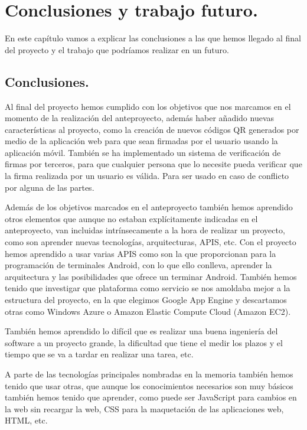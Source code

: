 \chapter{Conclusiones y trabajo futuro.}

En este capítulo vamos a explicar las conclusiones a las que hemos llegado al final del proyecto y el trabajo que podríamos realizar en un futuro.

\section{Conclusiones.}

Al final del proyecto hemos cumplido con los objetivos que nos marcamos en el momento de la realización del anteproyecto, además haber añadido nuevas características al proyecto, como la creación de nuevos códigos QR generados por medio de la aplicación web para que sean firmadas por el usuario usando la aplicación móvil. También se ha implementado un sistema de verificación de firmas por terceros, para que cualquier persona que lo necesite pueda verificar que la firma realizada por un usuario es válida. Para ser usado en caso de conflicto por alguna de las partes.

Además de los objetivos marcados en el anteproyecto también hemos aprendido otros elementos que aunque no estaban explícitamente indicadas en el anteproyecto, van incluidas intrínsecamente a la hora de realizar un proyecto, como son aprender nuevas tecnologías, arquitecturas, APIS, etc. Con el proyecto hemos aprendido a usar varias APIS como son la que proporcionan para la programación de terminales Android, con lo que ello conlleva, aprender la arquitectura y las posibilidades que ofrece un terminar Android. También hemos tenido que investigar que plataforma como servicio se nos amoldaba mejor a la estructura del proyecto, en la que elegimos Google App Engine y descartamos otras como Windows Azure o Amazon Elastic Compute Cloud (Amazon EC2).

También hemos aprendido lo difícil que es realizar una buena ingeniería del software a un proyecto grande, la dificultad que tiene el medir los plazos y el tiempo que se va a tardar en realizar una tarea, etc.

A parte de las tecnologías principales nombradas en la memoria también hemos tenido que usar otras, que aunque los conocimientos necesarios son muy básicos también hemos tenido que aprender, como puede ser JavaScript para cambios en la web sin recargar la web, CSS para la maquetación de las aplicaciones web, HTML, etc.

